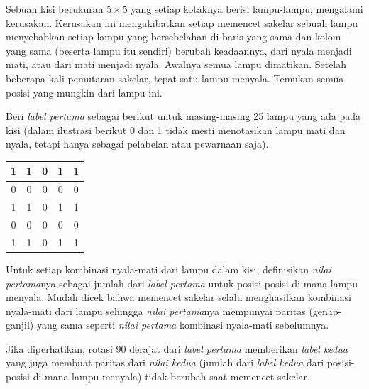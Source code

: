 \documentclass[11pt]{scrartcl}
\begin{document}
\begin{soaljawab}
    Sebuah kisi berukuran $5 \times 5$ yang setiap kotaknya berisi lampu-lampu, mengalami kerusakan. Kerusakan ini mengakibatkan setiap memencet sakelar sebuah lampu menyebabkan setiap lampu yang bersebelahan di baris yang sama dan kolom yang sama (beserta lampu itu sendiri) berubah keadaannya, dari nyala menjadi mati, atau dari mati menjadi nyala. Awalnya semua lampu dimatikan. Setelah beberapa kali pemutaran sakelar, tepat satu lampu menyala. Temukan semua posisi yang mungkin dari lampu ini.
    \begin{solusi}
        Beri \textit{label pertama} sebagai berikut untuk masing-masing 25 lampu yang ada pada kisi (dalam ilustrasi berikut 0 dan 1 tidak mesti menotasikan lampu mati dan nyala, tetapi hanya sebagai pelabelan atau pewarnaan saja).
        \begin{center}
        \begin{tabular}{ |c|c|c|c|c| }
		\hline
		1 & 1 & 0 & 1 & 1 \\
		\hline
		0 & 0 & 0 & 0 & 0 \\
		\hline
		1 & 1 & 0 & 1 & 1 \\
		\hline
		0 & 0 & 0 & 0 & 0 \\
		\hline
		1 & 1 & 0 & 1 & 1 \\
		\hline
	\end{tabular}
        \end{center}
        Untuk setiap kombinasi nyala-mati dari lampu dalam kisi, definisikan \textit{nilai pertama}nya sebagai jumlah dari \textit{label pertama} untuk posisi-posisi di mana lampu menyala. Mudah dicek bahwa memencet sakelar selalu menghasilkan kombinasi nyala-mati dari lampu sehingga \textit{nilai pertama}nya mempunyai paritas (genap-ganjil) yang sama seperti \textit{nilai pertama} kombinasi nyala-mati sebelumnya.
        
        Jika diperhatikan, rotasi 90 derajat dari \textit{label pertama} memberikan \textit{label kedua} yang juga membuat paritas dari \textit{nilai kedua} (jumlah dari \textit{label kedua} dari posisi-posisi di mana lampu menyala) tidak berubah saat memencet sakelar.


\end{solusi}
\end{soaljawab}
\end{document}
